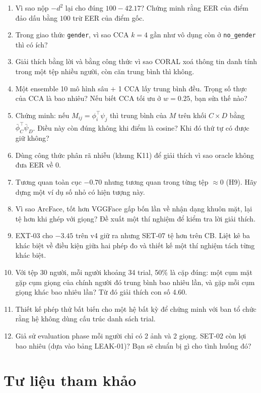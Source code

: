 \documentclass[11pt,a4paper,oneside]{report}
\newcommand{\id}[1]{\texttt{#1}}
\begin{document}
\begin{enumerate}[label=\textbf{\arabic*.}]
\item Vì sao nộp $-d^2$ lại cho đúng $100-42.17$? Chứng minh rằng EER của điểm đảo dấu bằng $100$ trừ EER của điểm gốc.
\item Trong giao thức \id{gender}, vì sao CCA $k=4$ gần như vô dụng còn ở \id{no\_gender} thì có ích?
\item Giải thích bằng lời và bằng công thức vì sao CORAL xoá thông tin danh tính trong một tệp nhiều người, còn căn trung bình thì không.
\item Một ensemble 10 mô hình sâu $+$ 1 CCA lấy trung bình đều. Trọng số thực của CCA là bao nhiêu? Nếu biết CCA tối ưu ở $w=0.25$, bạn sửa thế nào?
\item Chứng minh: nếu $M_{ij}=\phi_i^\top\psi_j$ thì trung bình của $M$ trên khối $C\times D$ bằng $\bar\phi_C^\top\bar\psi_D$. Điều này còn đúng không khi điểm là cosine? Khi đó thứ tự có được giữ không?
\item Dùng công thức phân rã nhiễu (khung K11) để giải thích vì sao oracle không đưa EER về 0.
\item Tương quan toàn cục $-0.70$ nhưng tương quan trong từng tệp $\approx0$ (H9). Hãy dựng một ví dụ số nhỏ có hiện tượng này.
\item Vì sao ArcFace, tốt hơn VGGFace gấp bốn lần về nhận dạng khuôn mặt, lại tệ hơn khi ghép với giọng? Đề xuất một thí nghiệm để kiểm tra lời giải thích.
\item EXT-03 cho $-3.45$ trên v4 giữ ra nhưng SET-07 tệ hơn trên CB. Liệt kê ba khác biệt về điều kiện giữa hai phép đo và thiết kế một thí nghiệm tách từng khác biệt.
\item Với tệp 30 người, mỗi người khoảng 34 trial, 50\% là cặp đúng: một cụm mặt gặp cụm giọng của chính người đó trung bình bao nhiêu lần, và gặp mỗi cụm giọng khác bao nhiêu lần? Từ đó giải thích con số 4.60.
\item Thiết kế phép thử bất biến cho một hệ bất kỳ để chứng minh với ban tổ chức rằng hệ không dùng cấu trúc danh sách trial.
\item Giả sử evaluation phase mỗi người chỉ có 2 ảnh và 2 giọng. SET-02 còn lợi bao nhiêu (dựa vào bảng LEAK-01)? Bạn sẽ chuẩn bị gì cho tình huống đó?
\end{enumerate}

\appendix
\chapter{Tư liệu tham khảo}
\end{document}
